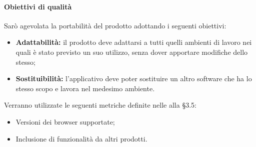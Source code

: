 \documentclass[PianoDiQualifica.tex]{subfiles}
\begin{document}
\paragraph{Obiettivi di qualità}
Sarò agevolata la portabilità del prodotto adottando i seguenti obiettivi:
\begin{itemize}
	\item \textbf{Adattabilità:} il prodotto deve adattarsi a tutti quelli ambienti di lavoro nei quali è stato previsto un suo utilizzo, senza dover apportare modifiche dello stesso;
	\item \textbf{Sostituibilità:} l'applicativo deve poter sostituire un altro software che ha lo stesso scopo e lavora nel medesimo ambiente.
\end{itemize}
Verranno utilizzate le seguenti metriche definite nelle \ndp alla \S{3.5}:
\begin{itemize}
	\item {} Versioni dei browser supportate;
	\item {} Inclusione di funzionalità da altri prodotti.
\end{itemize}
\end{document}
